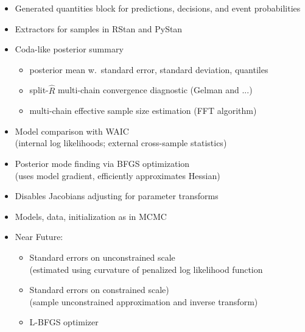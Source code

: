 \documentclass[10pt]{report}
\newcommand{\sld}[1]{\newpage{\noindent\LARGE \ \ \
    \textcolor{MidnightBlue}{\bfseries #1}}\vspace*{4pt}}
\begin{document}
\sld{Posterior Inference}

\begin{itemize}
\item Generated quantities block for predictions, decisions,
  and event probabilities
\item Extractors for samples in RStan and PyStan
\item Coda-like posterior summary
\vspace*{-4pt}
\begin{itemize}\small
\item posterior mean w.\ standard error, standard deviation, quantiles
\item split-$\hat{R}$ multi-chain convergence diagnostic (Gelman and ...)
\item multi-chain effective sample size estimation (FFT algorithm)
\end{itemize}
\item Model comparison with WAIC
\\
{\footnotesize (internal log likelihoods; external cross-sample statistics)}
\end{itemize}

\sld{Penalized MLE}

\begin{itemize}
\item Posterior mode finding via BFGS optimization
\\ {\footnotesize (uses model gradient, efficiently approximates Hessian)}
\item Disables Jacobians adjusting for parameter transforms
\item Models, data, initialization as in MCMC
\vfill
\item Near Future:
\vspace*{-4pt}
\begin{itemize}\small
\item  Standard errors on unconstrained scale
\\
{\footnotesize  (estimated using curvature of penalized log likelihood function}
\item Standard errors on constrained scale)
\\
{\footnotesize  (sample unconstrained approximation and inverse transform)}
\item L-BFGS optimizer
\end{itemize}      
\end{itemize}

\sld{Stan as a Research Tool}
\end{document}
